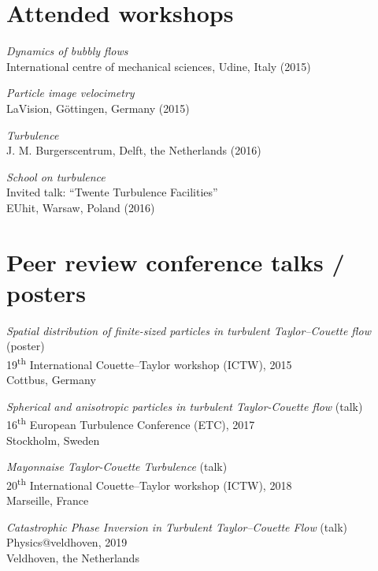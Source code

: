 \section*{Attended workshops}
\begin{packeditemize}
\item \textit{Dynamics of bubbly flows} \\
    International centre of mechanical sciences, Udine, Italy (2015)
\item \textit{Particle image velocimetry} \\
    LaVision, G\"ottingen, Germany (2015)
\item \textit{Turbulence} \\
    J. M. Burgerscentrum, Delft, the Netherlands (2016)
\item \textit{School on turbulence} \\
    Invited talk: ``Twente Turbulence Facilities'' \\
    EUhit, Warsaw, Poland (2016)
\end{packeditemize}

\section*{Peer review conference talks / posters}
\begin{packeditemize}
\item \textit{Spatial distribution of finite-sized particles in turbulent
    Taylor--Couette flow} (poster) \\
    19\textsuperscript{th} International Couette--Taylor workshop (ICTW), 2015 \\
    Cottbus, Germany
\item \textit{Spherical and anisotropic particles in turbulent Taylor-Couette
    flow} (talk) \\
    16\textsuperscript{th} European Turbulence Conference (ETC), 2017 \\
    Stockholm, Sweden 
\item \textit{Mayonnaise Taylor-Couette Turbulence} (talk) \\
    20\textsuperscript{th} International Couette--Taylor workshop (ICTW), 2018 \\
    Marseille, France
\item \textit{Catastrophic Phase Inversion in Turbulent Taylor--Couette Flow} (talk) \\
    Physics@veldhoven, 2019 \\
    Veldhoven, the Netherlands
\end{packeditemize}

